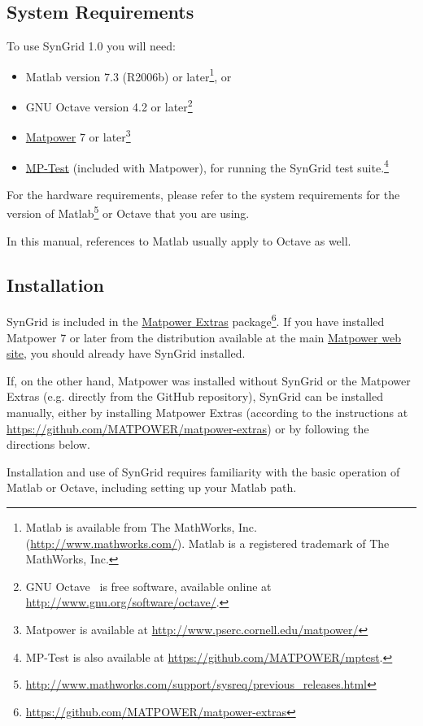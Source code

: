 \documentclass[12pt]{article}
\newcommand{\matlab}[0]{{\sc Matlab}}
\newcommand{\matpower}[0]{{\sc Matpower}}
\newcommand{\matpowerurl}[0]{http://www.pserc.cornell.edu/matpower/}
\newcommand{\matpowerlink}[0]{\href{\matpowerurl}{\matpower{}}}
\newcommand{\matpowerextras}[0]{{\matpower{} Extras}}
\newcommand{\matpowerextrasurl}[0]{https://github.com/MATPOWER/matpower-extras}
\newcommand{\matpowerextraslink}[0]{\href{\matpowerextrasurl}{\matpowerextras{}}}
\newcommand{\mptest}[0]{{MP-Test}}
\newcommand{\mptesturl}[0]{https://github.com/MATPOWER/mptest}
\newcommand{\mptestlink}[0]{\href{\mptesturl}{\mptest{}}}
\newcommand{\syngrid}[0]{{SynGrid}}
\newcommand{\syngridver}[0]{1.0}
\numberwithin{equation}{section}
\numberwithin{table}{section}
\numberwithin{figure}{section}
\begin{document}
\subsection{System Requirements}
\label{sec:sysreq}
To use \syngrid{} \syngridver{} you will need:
\begin{itemize}
\item \matlab{}\textsuperscript{\tiny \textregistered} version 7.3 (R2006b) or later\footnote{\matlab{} is available from The MathWorks, Inc. (\url{http://www.mathworks.com/}). \matlab{} is a registered trademark of The MathWorks, Inc.}, or
\item GNU Octave version 4.2 or later\footnote{GNU Octave~\cite{octave} is free software, available online at \url{http://www.gnu.org/software/octave/}.}
\item \matpowerlink{} 7 or later\footnote{\matpower{} is available at \url{\matpowerurl}}
\item \mptestlink{} (included with \matpower{}), for running the \syngrid{} test suite.\footnote{\mptest{} is also available at \url{\mptesturl}.}
\end{itemize}

For the hardware requirements, please refer to the system requirements for the version of \matlab{}\footnote{\url{http://www.mathworks.com/support/sysreq/previous_releases.html}} or Octave that you are using.

In this manual, references to \matlab{} usually apply to Octave as well.

\subsection{Installation}
\label{sec:installation}

\syngrid{} is included in the \matpowerextraslink{} package\footnote{\url{\matpowerextrasurl}}. If you have installed \matpower{} 7 or later from the distribution available at the main \href{\matpowerurl}{\matpower{} web site}, you should already have \syngrid{} installed.

If, on the other hand, \matpower{} was installed without \syngrid{} or the  \matpowerextras{} (e.g. directly from the GitHub repository), \syngrid{} can be installed manually, either by installing \matpowerextras{} (according to the instructions at \url{\matpowerextrasurl}) or by following the directions below.

Installation and use of \syngrid{} requires familiarity with the basic operation of \matlab{} or Octave, including setting up your \matlab{} path.
\end{document}
